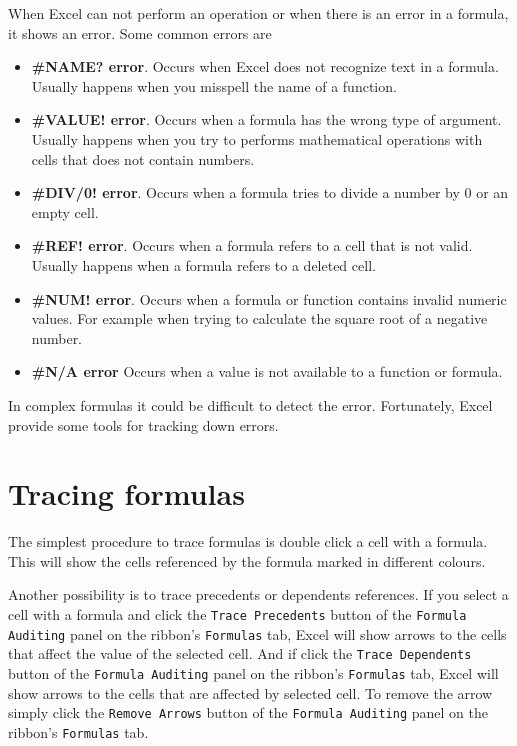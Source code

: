 When Excel can not perform an operation or when there is an error in a formula, it shows an error. Some common errors are

\begin{itemize}
\item \textbf{\#NAME? error}. Occurs when Excel does not recognize text in a formula. Usually happens when you misspell the name of a function.

\item \textbf{\#VALUE! error}. Occurs when a formula has the wrong type of argument. Usually happens when you try to performs mathematical operations with cells that does not contain numbers.

\item \textbf{\#DIV\slash 0! error}. Occurs when a formula tries to divide a number by 0 or an empty cell.

\item \textbf{\#REF! error}. Occurs when a formula refers to a cell that is not valid. Usually happens when a formula refers to a deleted cell.

\item \textbf{\#NUM! error}. Occurs when a formula or function contains invalid numeric values. For example when trying to calculate the square root of a negative number.

\item \textbf{\#N\slash A error} Occurs when a value is not available to a function or formula.

\end{itemize}

In complex formulas it could be difficult to detect the error. Fortunately, Excel provide some tools for tracking down errors. 

\section{Tracing formulas}
\label{tracingformulas}

The simplest procedure to trace formulas is double click a cell with a formula. This will show the cells referenced by the formula marked in different colours. 

Another possibility is to trace precedents or dependents references. If you select a cell with a formula and click the \texttt{Trace Precedents} button of the \texttt{Formula Auditing} panel on the ribbon's \texttt{Formulas} tab, Excel will show arrows to the cells that affect the value of the selected cell. And if click the \texttt{Trace Dependents} button of the \texttt{Formula Auditing} panel on the ribbon's \texttt{Formulas} tab, Excel will show arrows to the cells that are affected by selected cell. To remove the arrow simply click the \texttt{Remove Arrows} button of the \texttt{Formula Auditing} panel on the ribbon's \texttt{Formulas} tab.


